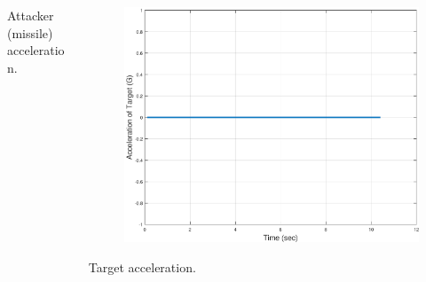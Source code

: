 \documentclass{beamer}
\begin{document}
\begin{frame}
\begin{columns}[c]
\begin{column}{.3\linewidth}
\begin{figure}[H]
			\label{missile accelerationXNT0HE0N4}
		\end{figure}
	Attacker (missile) acceleration.
	\end{column}
	\begin{column}{.3\linewidth}
		\begin{figure}[H]
			\centering
			\includegraphics[scale = 0.175]{fig/TargetAccelerationXNT0HE0N4.pdf}
			\label{Target accelerationXNT0HE0N4}
		\end{figure}
	Target acceleration.
	\end{column}
\end{columns}
\end{frame}
\end{document}
